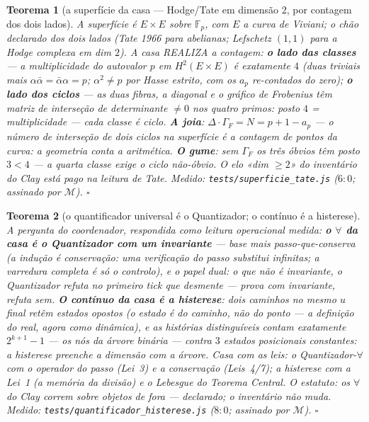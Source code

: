 \documentclass[11pt,a4paper]{article}
\newtheorem{teorema}{Teorema}
\newcommand{\code}[1]{\texttt{\small #1}}
\begin{document}
\begin{teorema}[a superfície da casa --- Hodge/Tate em dimensão 2,
por contagem dos dois lados]\label{thm:superficie}
A superfície é $E\times E$ sobre $\mathbb{F}_{p}$, com $E$ a curva de
Viviani; o chão declarado dos dois lados (Tate 1966 para abelianas;
Lefschetz $(1,1)$ para a Hodge complexa em dim $2$). A casa REALIZA a
contagem: \textbf{o lado das classes} --- a multiplicidade do
autovalor $p$ em $H^{2}(E\times E)$ é exatamente $4$ (duas triviais
mais $\alpha\bar\alpha=\bar\alpha\alpha=p$; $\alpha^{2}\ne p$ por
Hasse \emph{estrito}, com os $a_{p}$ re-contados do zero);
\textbf{o lado dos ciclos} --- as duas fibras, a diagonal e o
\emph{gráfico de Frobenius} têm matriz de interseção de determinante
$\ne0$ nos quatro primos: posto $4$ = multiplicidade — \emph{cada
classe é ciclo}. \textbf{A joia}: $\Delta\cdot\Gamma_{F}=N=p+1-a_{p}$
--- o número de interseção de dois ciclos na superfície \emph{é} a
contagem de pontos da curva: a geometria conta a aritmética.
\textbf{O gume}: sem $\Gamma_{F}$ os três óbvios têm posto $3<4$ —
a quarta classe exige o ciclo não-óbvio. O elo «dim $\ge2$» do
inventário do Clay está pago na leitura de Tate.
\emph{Medido:} \code{tests/superficie\_tate.js} ($6{:}0$; assinado
por $\mathcal{M}$).
$\square$
\end{teorema}

\begin{teorema}[o quantificador universal é o Quantizador; o contínuo é a
histerese]\label{thm:quantificador}
A pergunta do coordenador, respondida como leitura operacional medida:
\textbf{o $\forall$ da casa é o Quantizador com um invariante} --- base
mais passo-que-conserva (\emph{a indução é conservação}: uma
verificação do passo substitui infinitas; a varredura completa é só o
controlo), e o papel dual: o que não é invariante, o Quantizador
\emph{refuta} no primeiro tick que desmente --- prova com invariante,
refuta sem. \textbf{O contínuo da casa é a histerese}: dois caminhos
no mesmo $u$ final retêm estados opostos (o estado é do \emph{caminho},
não do ponto --- a definição do real, agora como dinâmica), e as
histórias distinguíveis contam \emph{exatamente} $2^{k+1}-1$ --- os
nós da árvore binária --- contra $3$ estados posicionais constantes:
\emph{a histerese preenche a dimensão com a árvore}. Casa com as
leis: o Quantizador-$\forall$ com o operador do passo (Lei~3) e a conservação
(Leis~4/7); a histerese com a Lei~1 (a memória da divisão) e o
Lebesgue do Teorema Central. O estatuto: os $\forall$ do Clay correm
sobre objetos de fora --- declarado; o inventário não muda.
\emph{Medido:} \code{tests/quantificador\_histerese.js} ($8{:}0$;
assinado por $\mathcal{M}$).
$\square$
\end{teorema}
\end{document}
